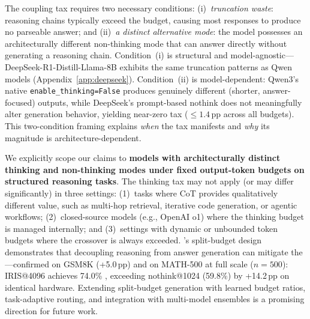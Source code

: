 The coupling tax requires two necessary conditions:
(i)~\emph{truncation waste}: reasoning chains typically exceed the budget, causing most responses to produce no parseable answer; and
(ii)~\emph{a distinct alternative mode}: the model possesses an architecturally different non-thinking mode that can answer directly without generating a reasoning chain.
Condition~(i) is structural and model-agnostic---DeepSeek-R1-Distill-Llama-8B exhibits the same truncation patterns as Qwen models (Appendix~\ref{app:deepseek}).
Condition~(ii) is model-dependent: Qwen3's native \texttt{enable\_thinking=False} produces genuinely different (shorter, answer-focused) outputs, while DeepSeek's prompt-based nothink does not meaningfully alter generation behavior, yielding near-zero tax (${\leq}1.4$\,pp across all budgets).
This two-condition framing explains \emph{when} the tax manifests and \emph{why} its magnitude is architecture-dependent.

We explicitly scope our claims to \textbf{models with architecturally distinct thinking and non-thinking modes under fixed output-token budgets on structured reasoning tasks}.
The thinking tax may not apply (or may differ significantly) in three settings: (1)~tasks where CoT provides qualitatively different value, such as multi-hop retrieval, iterative code generation, or agentic workflows; (2)~closed-source models (e.g., OpenAI o1) where the thinking budget is managed internally; and (3)~settings with dynamic or unbounded token budgets where the crossover is always exceeded.
\method{}'s split-budget design demonstrates that decoupling reasoning from answer generation can mitigate the \couplingtax{}---confirmed on GSM8K (+5.0\,pp) and on MATH-500 at full scale ($n{=}500$): IRIS@4096 achieves 74.0\% , exceeding nothink@1024 (59.8\%) by +14.2\,pp on identical hardware.
Extending split-budget generation with learned budget ratios, task-adaptive routing, and integration with multi-model ensembles is a promising direction for future work.

